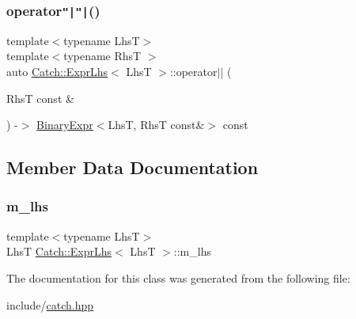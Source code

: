 \subsubsection{\texorpdfstring{operator\texttt{"|}\texttt{"|}()}{operator||()}}
{\footnotesize\ttfamily template$<$typename LhsT$>$ \\
template$<$typename RhsT $>$ \\
auto \mbox{\hyperlink{class_catch_1_1_expr_lhs}{Catch\+::\+Expr\+Lhs}}$<$ LhsT $>$\+::operator$\vert$$\vert$ (\begin{DoxyParamCaption}\item[{RhsT const \&}]{ }\end{DoxyParamCaption}) -\/$>$ \mbox{\hyperlink{class_catch_1_1_binary_expr}{Binary\+Expr}}$<$LhsT, RhsT const\&$>$ const \hspace{0.3cm}{\ttfamily [inline]}}



\subsection{Member Data Documentation}
\mbox{\label{class_catch_1_1_expr_lhs_af290873a8427ccbdae6acb915fb7366a}} 
\subsubsection{\texorpdfstring{m\_lhs}{m\_lhs}}
{\footnotesize\ttfamily template$<$typename LhsT$>$ \\
LhsT \mbox{\hyperlink{class_catch_1_1_expr_lhs}{Catch\+::\+Expr\+Lhs}}$<$ LhsT $>$\+::m\+\_\+lhs\hspace{0.3cm}{\ttfamily [private]}}



The documentation for this class was generated from the following file\+:\begin{DoxyCompactItemize}
\item 
include/\mbox{\hyperlink{catch_8hpp}{catch.\+hpp}}\end{DoxyCompactItemize}
